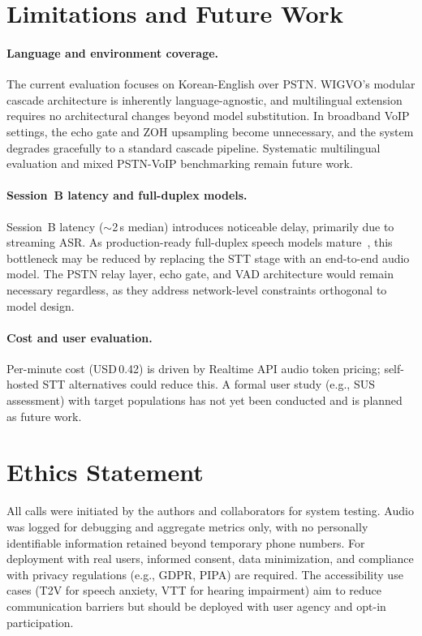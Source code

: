\documentclass[11pt]{article}
\begin{document}
\section{Limitations and Future Work}

\paragraph{Language and environment coverage.}
The current evaluation focuses on Korean-English over PSTN. WIGVO's modular cascade architecture is inherently language-agnostic, and multilingual extension requires no architectural changes beyond model substitution. In broadband VoIP settings, the echo gate and ZOH upsampling become unnecessary, and the system degrades gracefully to a standard cascade pipeline. Systematic multilingual evaluation and mixed PSTN-VoIP benchmarking remain future work.

\paragraph{Session~B latency and full-duplex models.}
Session~B latency (${\sim}$2\,s median) introduces noticeable delay, primarily due to streaming ASR. As production-ready full-duplex speech models mature~\citep{defossez2024moshi, labiausse2025hibiki}, this bottleneck may be reduced by replacing the STT stage with an end-to-end audio model. The PSTN relay layer, echo gate, and VAD architecture would remain necessary regardless, as they address network-level constraints orthogonal to model design.

\paragraph{Cost and user evaluation.}
Per-minute cost (USD\,0.42) is driven by Realtime API audio token pricing; self-hosted STT alternatives could reduce this. A formal user study (e.g., SUS assessment) with target populations has not yet been conducted and is planned as future work.

\section*{Ethics Statement}

All calls were initiated by the authors and collaborators for system testing. Audio was logged for debugging and aggregate metrics only, with no personally identifiable information retained beyond temporary phone numbers. For deployment with real users, informed consent, data minimization, and compliance with privacy regulations (e.g., GDPR, PIPA) are required. The accessibility use cases (T2V for speech anxiety, VTT for hearing impairment) aim to reduce communication barriers but should be deployed with user agency and opt-in participation.
\end{document}
